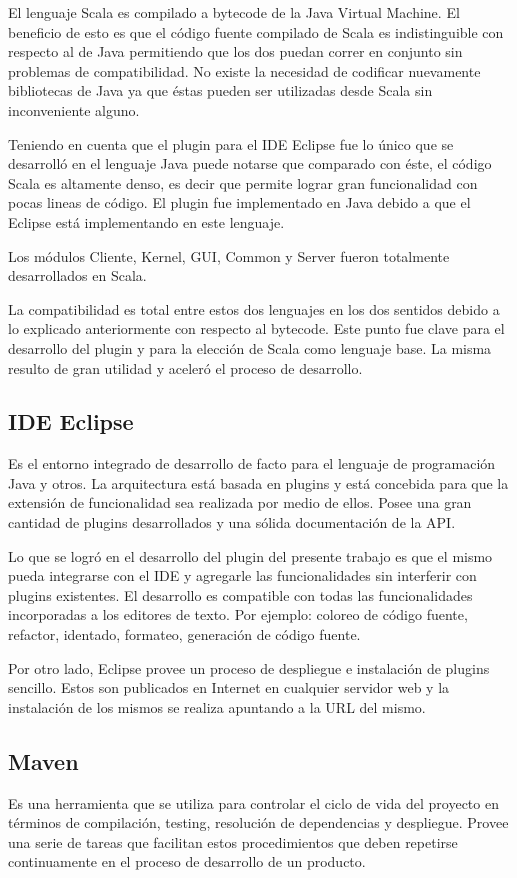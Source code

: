 \documentclass[12pt,a4paper]{article}
\begin{document}
El lenguaje Scala es compilado a bytecode de la Java Virtual Machine. El beneficio de esto es que el código fuente
compilado de Scala es indistinguible con respecto al de Java permitiendo que los dos puedan correr en conjunto
sin problemas de compatibilidad. No existe la necesidad de codificar nuevamente bibliotecas de Java
ya que éstas pueden ser utilizadas desde Scala sin inconveniente alguno.

Teniendo en cuenta que el plugin para el IDE Eclipse fue lo único que se desarrolló en el lenguaje Java puede
notarse que comparado con éste, el código Scala es altamente denso, es decir que permite lograr gran funcionalidad 
con pocas lineas de código. El plugin fue implementado en Java debido a que el Eclipse está
implementando en este lenguaje.

Los módulos Cliente, Kernel, GUI, Common y Server fueron totalmente desarrollados en Scala.

La compatibilidad es total entre estos dos lenguajes en los dos sentidos debido a lo explicado anteriormente con
respecto al bytecode.
Este punto fue clave para el desarrollo del plugin y para la elección de Scala como lenguaje base. La misma 
resulto de gran utilidad y aceleró el proceso de desarrollo.

\subsection{IDE Eclipse}
Es el entorno integrado de desarrollo de facto para el lenguaje de programación Java y otros. La arquitectura está
basada en plugins y está concebida para que la extensión de funcionalidad sea realizada por medio de ellos. 
Posee una gran cantidad  de plugins desarrollados y una sólida documentación de la API.

Lo que se logró en el desarrollo del plugin del presente trabajo es que el mismo pueda integrarse con el IDE
y agregarle las funcionalidades sin interferir con plugins existentes. El desarrollo es compatible
con todas las funcionalidades incorporadas a los editores de texto. Por ejemplo: coloreo de código fuente, refactor,
identado, formateo, generación de código fuente.

Por otro lado, Eclipse provee un proceso de despliegue e instalación de plugins sencillo. Estos son publicados 
en Internet en cualquier servidor web y la instalación de los mismos se realiza apuntando a la URL del mismo.

\subsection{Maven}
Es una herramienta que se utiliza para controlar el ciclo de vida del proyecto en términos de compilación, testing,
resolución de dependencias y despliegue. Provee una serie de tareas que facilitan estos procedimientos que deben
repetirse continuamente en el proceso de desarrollo de un producto.
\end{document}
